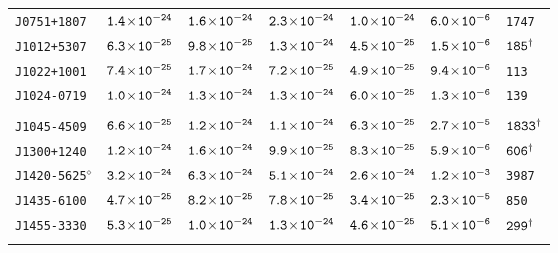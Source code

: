 \begin{longtable}{l | c | c | c | c | c | l}
\scriptsize{\tt{J0751+1807}} & \scriptsize{$\tt{1.4\!\times\!10^{-24}}$} & \scriptsize{$\tt{1.6\!\times\!10^{-24}}$} & \scriptsize{$\tt{2.3\!\times\!10^{-24}}$} &\scriptsize{$\tt{1.0\!\times\!10^{-24}}$} & \scriptsize{$\tt{6.0\!\times\!10^{-6}}$} & \scriptsize{\tt{1747}} \\[-16pt] 
\scriptsize{\tt{J1012+5307}} & \scriptsize{$\tt{6.3\!\times\!10^{-25}}$} & \scriptsize{$\tt{9.8\!\times\!10^{-25}}$} & \scriptsize{$\tt{1.3\!\times\!10^{-24}}$} & \scriptsize{$\tt{4.5\!\times\!10^{-25}}$} & \scriptsize{$\tt{1.5\!\times\!10^{-6}}$} & \scriptsize{$\tt{185^{\dagger}}$} \\[-16pt] 
\scriptsize{\tt{J1022+1001}} & \scriptsize{$\tt{7.4\!\times\!10^{-25}}$} & \scriptsize{$\tt{1.7\!\times\!10^{-24}}$} & \scriptsize{$\tt{7.2\!\times\!10^{-25}}$} &\scriptsize{$\tt{4.9\!\times\!10^{-25}}$} & \scriptsize{$\tt{9.4\!\times\!10^{-6}}$} & \scriptsize{\tt{113}} \\[-16pt] 
\scriptsize{\tt{J1024-0719}} & \scriptsize{$\tt{1.0\!\times\!10^{-24}}$} & \scriptsize{$\tt{1.3\!\times\!10^{-24}}$} & \scriptsize{$\tt{1.3\!\times\!10^{-24}}$} &\scriptsize{$\tt{6.0\!\times\!10^{-25}}$} & \scriptsize{$\tt{1.3\!\times\!10^{-6}}$} & \scriptsize{\tt{139}} \\[-16pt] 
\\[-20pt] 
\scriptsize{\tt{J1045-4509}} & \scriptsize{$\tt{6.6\!\times\!10^{-25}}$} & \scriptsize{$\tt{1.2\!\times\!10^{-24}}$} & \scriptsize{$\tt{1.1\!\times\!10^{-24}}$} & \scriptsize{$\tt{6.3\!\times\!10^{-25}}$} & \scriptsize{$\tt{2.7\!\times\!10^{-5}}$} & \scriptsize{$\tt{1833^{\dagger}}$} \\[-16pt] 
\scriptsize{\tt{J1300+1240}} & \scriptsize{$\tt{1.2\!\times\!10^{-24}}$} & \scriptsize{$\tt{1.6\!\times\!10^{-24}}$} & \scriptsize{$\tt{9.9\!\times\!10^{-25}}$} & \scriptsize{$\tt{8.3\!\times\!10^{-25}}$} & \scriptsize{$\tt{5.9\!\times\!10^{-6}}$} & \scriptsize{$\tt{606^{\dagger}}$} \\[-16pt] 
\scriptsize{\tt{J1420-5625}$^{\diamond}$} & \scriptsize{$\tt{3.2\!\times\!10^{-24}}$} &
\scriptsize{$\tt{6.3\!\times\!10^{-24}}$} & \scriptsize{$\tt{5.1\!\times\!10^{-24}}$} &\scriptsize{$\tt{2.6\!\times\!10^{-24}}$} &
\scriptsize{$\tt{1.2\!\times\!10^{-3}}$} & \scriptsize{\tt{3987}} \\[-16pt] 
\scriptsize{\tt{J1435-6100}} & \scriptsize{$\tt{4.7\!\times\!10^{-25}}$} & \scriptsize{$\tt{8.2\!\times\!10^{-25}}$} & \scriptsize{$\tt{7.8\!\times\!10^{-25}}$} &\scriptsize{$\tt{3.4\!\times\!10^{-25}}$} & \scriptsize{$\tt{2.3\!\times\!10^{-5}}$} & \scriptsize{\tt{850}} \\[-16pt] 
\scriptsize{\tt{J1455-3330}} & \scriptsize{$\tt{5.3\!\times\!10^{-25}}$} & \scriptsize{$\tt{1.0\!\times\!10^{-24}}$} & \scriptsize{$\tt{1.3\!\times\!10^{-24}}$} & \scriptsize{$\tt{4.6\!\times\!10^{-25}}$} & \scriptsize{$\tt{5.1\!\times\!10^{-6}}$} & \scriptsize{$\tt{299^{\dagger}}$} \\[-16pt] 
\\[-20pt] 

\end{longtable}
